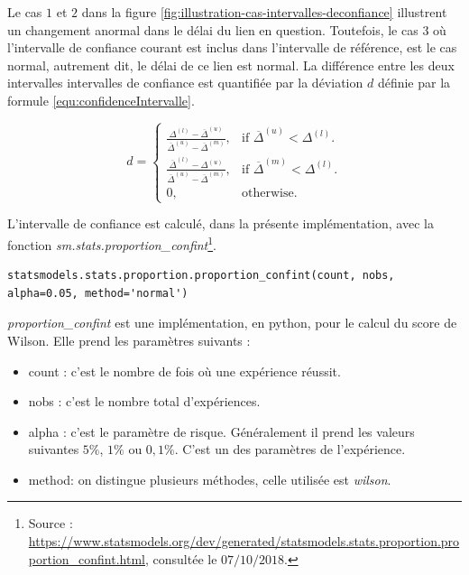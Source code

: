 Le cas $ 1 $ et $ 2 $ dans la figure 	\ref{fig:illustration-cas-intervalles-deconfiance} illustrent un changement anormal dans le délai du lien en question. Toutefois, le cas $ 3 $ où l'intervalle de confiance courant est inclus dans l'intervalle de référence, est le cas normal, autrement dit,  le délai de ce lien est normal. La différence entre les deux intervalles intervalles de confiance est quantifiée par la déviation $d$ définie par la formule \ref{equ:confidenceIntervalle}.

\begin{equation} \label{equ:confidenceIntervalle}
d=\begin{cases}
\frac{\Delta^{(l)} - \overline{\Delta}^{(u)}}{\overline{\Delta}^{(u)} - \overline{\Delta}^{(m)}}    , & \text{if $\overline{\Delta}^{(u)}<\Delta^{(l)}$}.\\

\frac{\overline{\Delta}^{(l)} - \Delta^{(u)}}{\overline{\Delta}^{(u)} - \overline{\Delta}^{(m)}}, & \text{if $\overline{\Delta}^{(m)}<\Delta^{(l)}$}.\\
0, & \text{otherwise}.
\end{cases}
\end{equation}

L'intervalle de confiance est calculé, dans la présente implémentation, avec la fonction  \textit{sm.stats.proportion\_confint}\footnote{Source : \url{https://www.statsmodels.org/dev/generated/statsmodels.stats.proportion.proportion_confint.html}, consultée le $ 07/10/2018 $.}.

\begin{lstlisting}[basicstyle=\tiny]
statsmodels.stats.proportion.proportion_confint(count, nobs, alpha=0.05, method='normal')
\end{lstlisting} 

\textit{proportion\_confint} est une implémentation, en python, pour le calcul du score de Wilson. Elle prend les paramètres suivants : 
\begin{itemize}
	\item count  : c'est le nombre de fois où une expérience  réussit.
	\item nobs : c'est le nombre total d'expériences.
	\item alpha : c'est le paramètre de risque. Généralement il prend les valeurs suivantes $ 5\% $, $ 1\% $ ou $ 0,1\% $. C'est un des paramètres de l'expérience.
	\item method: on distingue plusieurs méthodes, celle utilisée est \textit{wilson}.
\end{itemize}



